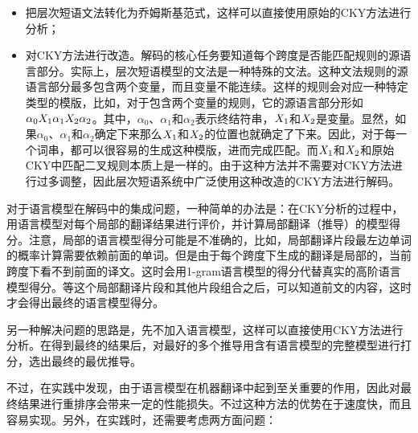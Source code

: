 \begin{itemize}
\vspace{0.5em}
\item 把层次短语文法转化为乔姆斯基范式，这样可以直接使用原始的CKY方法进行分析；
\vspace{0.5em}
\item 对CKY方法进行改造。解码的核心任务要知道每个跨度是否能匹配规则的源语言部分。实际上，层次短语模型的文法是一种特殊的文法。这种文法规则的源语言部分最多包含两个变量，而且变量不能连续。这样的规则会对应一种特定类型的模版，比如，对于包含两个变量的规则，它的源语言部分形如$\alpha_0 {X}_1 \alpha_1 {X}_2 \alpha_2$。其中，$\alpha_0$、$\alpha_1$和$\alpha_2$表示终结符串，${X}_1$和${X}_2$是变量。显然，如果$\alpha_0$、$\alpha_1$和$\alpha_2$确定下来那么${X}_1$和${X}_2$的位置也就确定了下来。因此，对于每一个词串，都可以很容易的生成这种模版，进而完成匹配。而${X}_1$和${X}_2$和原始CKY中匹配二叉规则本质上是一样的。由于这种方法并不需要对CKY方法进行过多调整，因此层次短语系统中广泛使用这种改造的CKY方法进行解码。
\vspace{0.5em}
\end{itemize}

\parinterval 对于语言模型在解码中的集成问题，一种简单的办法是：在CKY分析的过程中，用语言模型对每个局部的翻译结果进行评价，并计算局部翻译（推导）的模型得分。注意，局部的语言模型得分可能是不准确的，比如，局部翻译片段最左边单词的概率计算需要依赖前面的单词。但是由于每个跨度下生成的翻译是局部的，当前跨度下看不到前面的译文。这时会用1-gram语言模型的得分代替真实的高阶语言模型得分。等这个局部翻译片段和其他片段组合之后，可以知道前文的内容，这时才会得出最终的语言模型得分。

\parinterval 另一种解决问题的思路是，先不加入语言模型，这样可以直接使用CKY方法进行分析。在得到最终的结果后，对最好的多个推导用含有语言模型的完整模型进行打分，选出最终的最优推导。

\parinterval 不过，在实践中发现，由于语言模型在机器翻译中起到至关重要的作用，因此对最终结果进行重排序会带来一定的性能损失。不过这种方法的优势在于速度快，而且容易实现。另外，在实践时，还需要考虑两方面问题：

